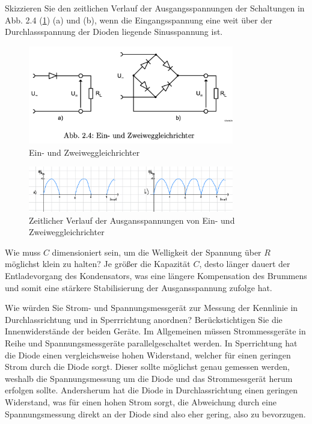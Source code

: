 \documentclass{article}
\theoremstyle{definition}
\begin{document}
\begin{voraufgabe}{Skizzieren Sie den zeitlichen Verlauf der Ausgangsspannungen der Schaltungen in Abb. 2.4 (\ref{fig:Abb2.4}) (a) und (b), wenn die Eingangsspannung eine weit über der Durchlassspannung der Dioden liegende Sinusspannung ist.}
    \begin{figure}[H]
        \centering
        \includegraphics[width=0.8\textwidth]{figs/fig2_4.png}
        \caption{Ein- und Zweiweggleichrichter\cite{anleitung}}
        \label{fig:Abb2.4}
    \end{figure}
    \begin{figure}[H]
        \centering
        \includegraphics[width=0.8\textwidth]{figs/fig2_D.png}
        \caption{Zeitlicher Verlauf der Ausgansspannungen von Ein- und Zweiweggleichrichter}
        \label{figD}
    \end{figure}
\end{voraufgabe}
\begin{voraufgabe}{Wie muss $C$ dimensioniert sein, um die Welligkeit der Spannung über $R$ möglichst klein zu halten?}
Je größer die Kapazität $C$, desto länger dauert der Entladevorgang des Kondensators, was eine längere Kompensation des Brummens und somit eine stärkere Stabilisierung der Ausgansspannung zufolge hat.

\end{voraufgabe}
\label{F}
\begin{voraufgabe}{Wie würden Sie Strom- und Spannungsmessgerät zur Messung der Kennlinie in Durchlassrichtung und in Sperrrichtung anordnen? Berückstichtigen Sie die Innenwiderstände der beiden Geräte.}
Im Allgemeinen müssen Strommessgeräte in Reihe und Spannungsmessgeräte parallelgeschaltet werden. In Sperrichtung hat die Diode einen vergleichsweise hohen Widerstand, welcher für einen geringen Strom durch die Diode sorgt. Dieser sollte möglichst genau gemessen werden, weshalb die Spannungsmessung um die Diode und das Strommessgerät herum erfolgen sollte. Andersherum hat die Diode in Durchlassrichtung einen geringen Widerstand, was für einen hohen Strom sorgt, die Abweichung durch eine Spannungsmessung direkt an der Diode sind also eher gering, also zu bevorzugen.


\end{voraufgabe}
\end{document}
